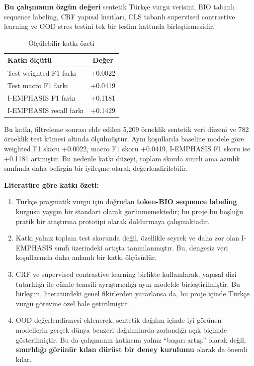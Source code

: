 \documentclass[conference]{IEEEtran}
\begin{document}
\textbf{Bu çalışmanın özgün değeri} sentetik Türkçe vurgu verisini, BIO tabanlı sequence labeling, CRF yapısal kısıtları, CLS tabanlı supervised contrastive learning ve OOD stres testini tek bir teslim hattında birleştirmesidir.

\vspace{0.3cm}
\begin{table}[H]
\centering
\caption{Ölçülebilir katkı özeti}
\begin{tabular}{p{8cm}c}
\toprule
Katkı ölçütü & Değer \\
\midrule
Test weighted F1 farkı & +0.0022 \\
Test macro F1 farkı & +0.0419 \\
I-EMPHASIS F1 farkı & +0.1181 \\
I-EMPHASIS recall farkı & +0.1429 \\
\bottomrule
\end{tabular}
\end{table}

Bu katkı, filtreleme sonrası elde edilen 5{,}209 örneklik sentetik veri düzeni ve 782 örneklik test kümesi altında ölçülmüştür. Aynı koşullarda baseline modele göre weighted F1 skoru +0.0022, macro F1 skoru +0.0419, I-EMPHASIS F1 skoru ise +0.1181 artmıştır. Bu nedenle katkı düzeyi, toplam skorda sınırlı ama azınlık sınıfında daha belirgin bir iyileşme olarak değerlendirilebilir.

\textbf{Literatüre göre katkı özeti:}
\begin{enumerate}
    \item Türkçe pragmatik vurgu için doğrudan \textbf{token-BIO sequence labeling} kurgusu yaygın bir standart olarak görünmemektedir; bu proje bu boşluğu pratik bir araştırma prototipi olarak doldurmaya çalışmaktadır.
    \item Katkı yalnız toplam test skorunda değil, özellikle seyrek ve daha zor olan I-EMPHASIS sınıfı üzerindeki artışta tanımlanmıştır. Bu, dengesiz veri koşullarında daha anlamlı bir katkı ölçüsüdür.
    \item CRF ve supervised contrastive learning birlikte kullanılarak, yapısal dizi tutarlılığı ile cümle temsili ayrıştırıcılığı aynı modelde birleştirilmiştir. Bu birleşim, literatürdeki genel fikirlerden yararlansa da, bu proje içinde Türkçe vurgu görevine özel hale getirilmiştir \cite{crfner,gunel2021}.
    \item OOD değerlendirmesi eklenerek, sentetik dağılım içinde iyi görünen modellerin gerçek dünya benzeri dağılımlarda zorlandığı açık biçimde gösterilmiştir. Bu da çalışmanın katkısını yalnız ``başarı artışı'' olarak değil, \textbf{sınırlılığı görünür kılan dürüst bir deney kurulumu} olarak da önemli kılar.
\end{enumerate}
\end{document}

